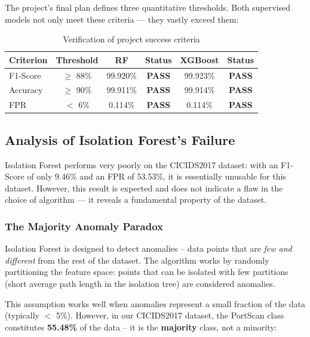 The project's final plan defines three quantitative thresholds. Both supervised models not only meet these criteria --- they vastly exceed them:

\begin{table}[H]
\centering
\caption{Verification of project success criteria}
\label{tab:success}
\begin{tabular}{lccccc}
\toprule
\textbf{Criterion} & \textbf{Threshold} & \textbf{RF} & \textbf{Status} & \textbf{XGBoost} & \textbf{Status} \\
\midrule
F1-Score & $\geq$ 88\% & 99.920\% & \textbf{PASS} & 99.923\% & \textbf{PASS} \\
Accuracy & $\geq$ 90\% & 99.911\% & \textbf{PASS} & 99.914\% & \textbf{PASS} \\
FPR & $<$ 6\% & 0.114\% & \textbf{PASS} & 0.114\% & \textbf{PASS} \\
\bottomrule
\end{tabular}
\end{table}

\subsection{Analysis of Isolation Forest's Failure}

Isolation Forest performs very poorly on the CICIDS2017 dataset: with an F1-Score of only 9.46\% and an FPR of 53.53\%, it is essentially unusable for this dataset. However, this result is expected and does not indicate a flaw in the choice of algorithm --- it reveals a fundamental property of the dataset.

\subsubsection{The Majority Anomaly Paradox}

Isolation Forest is designed to detect anomalies -- data points that are \textit{few and different} from the rest of the dataset. The algorithm works by randomly partitioning the feature space: points that can be isolated with few partitions (short average path length in the isolation tree) are considered anomalies.

This assumption works well when anomalies represent a small fraction of the data (typically $<$ 5\%). However, in our CICIDS2017 dataset, the PortScan class constitutes \textbf{55.48\%} of the data -- it is the \textbf{majority} class, not a minority:

